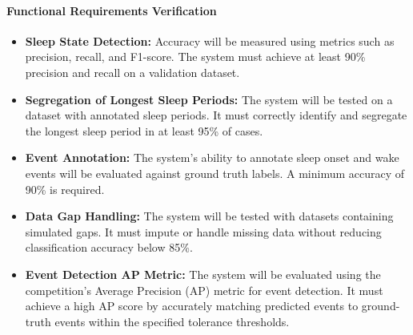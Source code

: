 \documentclass[conference]{IEEEtran}
\begin{document}
\paragraph{Functional Requirements Verification}
\begin{itemize}
    \item \textbf{Sleep State Detection:} Accuracy will be measured using metrics such as precision, recall, and F1-score. The system must achieve at least 90\% precision and recall on a validation dataset.
    \item \textbf{Segregation of Longest Sleep Periods:} The system will be tested on a dataset with annotated sleep periods. It must correctly identify and segregate the longest sleep period in at least 95\% of cases.
    \item \textbf{Event Annotation:} The system's ability to annotate sleep onset and wake events will be evaluated against ground truth labels. A minimum accuracy of 90\% is required.
    \item \textbf{Data Gap Handling:} The system will be tested with datasets containing simulated gaps. It must impute or handle missing data without reducing classification accuracy below 85\%.
    \item \textbf{Event Detection AP Metric:} The system will be evaluated using the competition's Average Precision (AP) metric for event detection. It must achieve a high AP score by accurately matching predicted events to ground-truth events within the specified tolerance thresholds.
\end{itemize}
\end{document}
